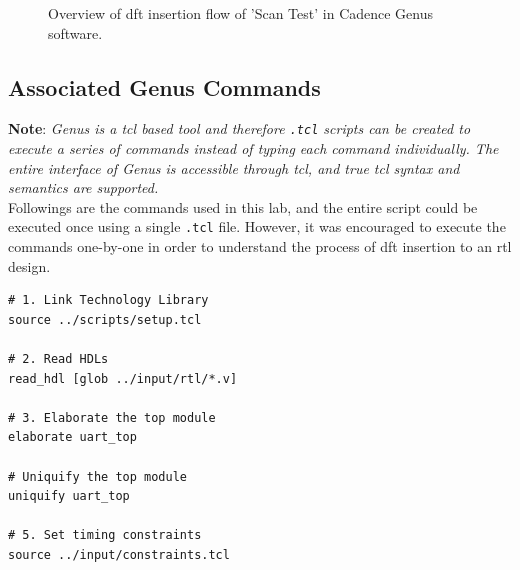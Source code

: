 \documentclass[a4paper,11pt]{article}%
\begin{document}
\begin{figure}[h]
	\centering
	\caption{Overview of \ac{dft} insertion flow of 'Scan Test' in Cadence Genus software.}
	\label{fig:dftinsertion}
\end{figure}

\pagebreak
\subsection{Associated Genus Commands}

\textbf{Note}: \textit{Genus is a \ac{tcl} based tool and therefore {\tt .tcl} scripts can be created to execute a series of commands instead of typing each command individually. The entire interface of Genus is accessible through \ac{tcl}, and true \ac{tcl} syntax and semantics are supported.}\\

Followings are the commands used in this lab, and the entire script could be executed once using a single {\tt .tcl} file. However, it was encouraged to execute the commands one-by-one in order to understand the process of \ac{dft} insertion to an \ac{rtl} design.

\begin{Verbatim}[frame=single]
# 1. Link Technology Library
source ../scripts/setup.tcl

# 2. Read HDLs
read_hdl [glob ../input/rtl/*.v]

# 3. Elaborate the top module
elaborate uart_top

# Uniquify the top module
uniquify uart_top

# 5. Set timing constraints
source ../input/constraints.tcl
\end{Verbatim}
\end{document}
